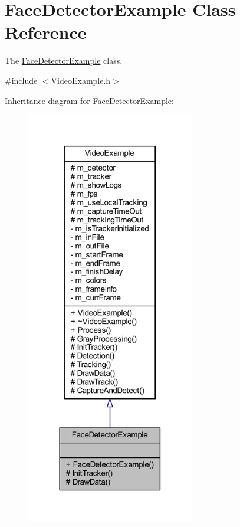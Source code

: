 \hypertarget{class_face_detector_example}{}\section{Face\+Detector\+Example Class Reference}
\label{class_face_detector_example}


The \mbox{\hyperlink{class_face_detector_example}{Face\+Detector\+Example}} class.  




{\ttfamily \#include $<$Video\+Example.\+h$>$}



Inheritance diagram for Face\+Detector\+Example\+:\nopagebreak
\begin{figure}[H]
\begin{center}
\leavevmode
\includegraphics[width=208pt]{class_face_detector_example__inherit__graph}
\end{center}
\end{figure}


